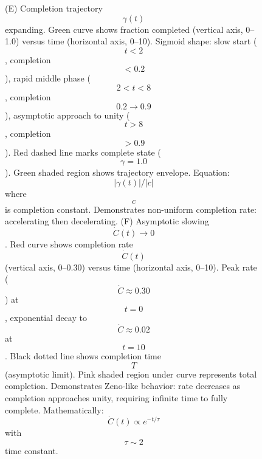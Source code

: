 \begin{figure}[htbp]
{                          (E) Completion trajectory $$\gamma(t)$$ expanding. Green curve shows fraction completed (vertical axis, 0--1.0) versus time (horizontal axis, 0--10). Sigmoid shape: slow start ($$t < 2$$, completion $$< 0.2$$), rapid middle phase ($$2 < t < 8$$, completion $$0.2 \to 0.9$$), asymptotic approach to unity ($$t > 8$$, completion $$> 0.9$$). Red dashed line marks complete state ($$\gamma = 1.0$$). Green shaded region shows trajectory envelope. Equation: $$|\gamma(t)|/|c|$$ where $$c$$ is completion constant. Demonstrates non-uniform completion rate: accelerating then decelerating. 
                          (F) Asymptotic slowing $$\dot{C}(t) \to 0$$. Red curve shows completion rate $$\dot{C}(t)$$ (vertical axis, 0--0.30) versus time (horizontal axis, 0--10). Peak rate ($$\dot{C} \approx 0.30$$) at $$t = 0$$, exponential decay to $$\dot{C} \approx 0.02$$ at $$t = 10$$. Black dotted line shows completion time $$T$$ (asymptotic limit). Pink shaded region under curve represents total completion. Demonstrates Zeno-like behavior: rate decreases as completion approaches unity, requiring infinite time to fully complete. Mathematically: $$\dot{C}(t) \propto e^{-t/\tau}$$ with $$\tau \sim 2$$ time constant.}
                          \label{fig:topology_categorical_spaces}
                          \end{figure}
